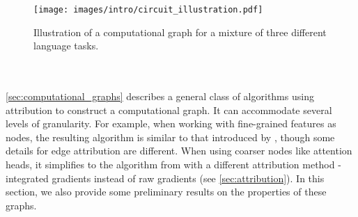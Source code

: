 \documentclass{article}
\begin{document}
\begin{wrapfigure}{l}{0.43\textwidth}
    \vspace{-4.em}
    \centering
    \texttt{[image: images/intro/circuit\_illustration.pdf]}
    \caption{Illustration of a computational graph for a mixture of three different language tasks.}
    \label{fig:circuit_illustration}
\end{wrapfigure}
~\\
\paragraph{}\cref{sec:computational_graphs} describes a general class of algorithms using attribution to construct a computational graph. It can accommodate several levels of granularity. For example, when working with fine-grained features as nodes, the resulting algorithm is similar to that introduced by \citet{marks2024sparseCircuits}, though some details for edge attribution are different. When using coarser nodes like attention heads, it simplifies to the algorithm from \citet{syed2023attributionCircuits} with a different attribution method - integrated gradients instead of raw gradients (see \cref{sec:attribution}). In this section, we also provide some preliminary results on the properties of these graphs.
~\\
\end{document}
